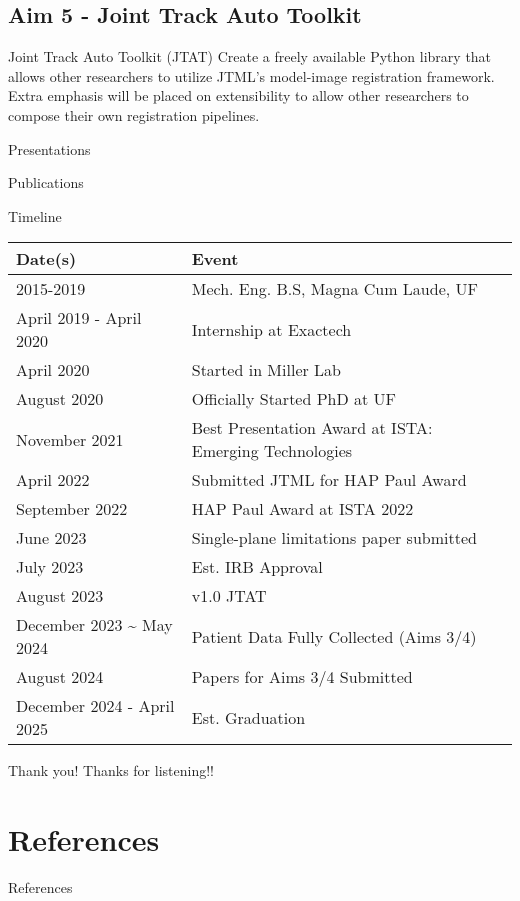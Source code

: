 \documentclass[presentation, aspectratio=1610]{beamer}
\begin{document}
\subsection{Aim 5 - Joint Track Auto Toolkit}
\label{sec:org0c7cdb8}
\begin{frame}[label={sec:orge63743a}]{Joint Track Auto Toolkit (JTAT)}
Create a freely available Python library that allows other researchers to utilize JTML's model-image registration framework. Extra emphasis will be placed on extensibility to allow other researchers to compose their own registration pipelines.
\end{frame}
\begin{frame}[label={sec:org7964be5},fragile, allowframebreaks, label=]{Presentations}
\begin{refsection}
  
  \printbibliography[title=Presentations]
\end{refsection}
\end{frame}
\begin{frame}[label={sec:org4284335},fragile, allowframebreaks, label=]{Publications}
\begin{refsection}
  
  \printbibliography[title=Publications]
\end{refsection}
\end{frame}
\begin{frame}[label={sec:org8556f7e}]{Timeline}
\begin{center}
\begin{tabular}{ll}
Date(s) & Event\\
\hline
2015-2019 & Mech. Eng. B.S, Magna Cum Laude, UF\\
April 2019 - April 2020 & Internship at Exactech\\
April 2020 & Started in Miller Lab\\
August 2020 & Officially Started PhD at UF\\
November 2021 & Best Presentation Award at ISTA: Emerging Technologies\\
April 2022 & Submitted JTML for HAP Paul Award\\
September 2022 & HAP Paul Award at ISTA 2022\\
\hline
June 2023 & Single-plane limitations paper submitted\\
July 2023 & Est. IRB Approval\\
August 2023 & v1.0 JTAT\\
December 2023 \textasciitilde{} May 2024 & Patient Data Fully Collected (Aims 3/4)\\
August 2024 & Papers for Aims 3/4 Submitted\\
December 2024 - April 2025 & Est. Graduation\\
\end{tabular}
\end{center}
\end{frame}
\begin{frame}[label={sec:orga3621d4},standout]{Thank you!}
Thanks for listening!!
\end{frame}
\section{References}
\label{sec:org63d3dff}
\begin{frame}[label={sec:org59f4e8a},fragile, allowframebreaks, label=]{References}
\AtNextBibliography{\tiny}
\printbibliography
\end{frame}
\end{document}
